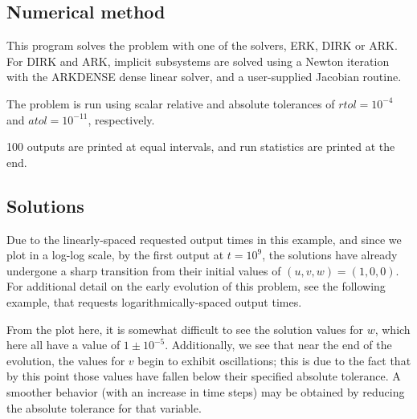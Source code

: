 \documentclass[letterpaper,10pt,english]{sphinxmanual}
\begin{document}
\subsection{Numerical method}
\label{c_serial:id11}
This program solves the problem with one of the solvers, ERK, DIRK or
ARK.  For DIRK and ARK, implicit subsystems are solved using a Newton
iteration with the ARKDENSE dense linear solver, and a user-supplied
Jacobian routine.

The problem is run using scalar relative and absolute tolerances of
\(rtol=10^{-4}\) and \(atol=10^{-11}\), respectively.

100 outputs are printed at equal intervals, and run statistics are
printed at the end.


\subsection{Solutions}
\label{c_serial:id12}
Due to the linearly-spaced requested output times in this example, and
since we plot in a log-log scale, by the first output at
\(t=10^9\), the solutions have already undergone a sharp
transition from their initial values of \((u,v,w) = (1, 0, 0)\).
For additional detail on the early evolution of this problem, see the
following example, that requests logarithmically-spaced output times.

From the plot here, it is somewhat difficult to see the solution
values for \(w\), which here all have a value of
\(1\pm10^{-5}\).  Additionally, we see that near the end of the
evolution, the values for \(v\) begin to exhibit oscillations;
this is due to the fact that by this point those values have fallen
below their specified absolute tolerance.  A smoother behavior (with
an increase in time steps) may be obtained by reducing the absolute
tolerance for that variable.
\begin{figure}[htbp]
\centering

\end{figure}
\end{document}

